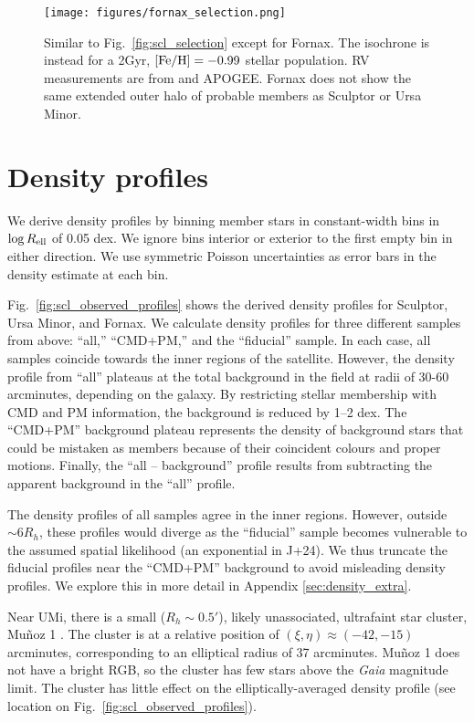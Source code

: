 \begin{figure}
\centering
\texttt{[image: figures/fornax\_selection.png]}
\caption[Fornax sample selection]{Similar to
Fig.~\ref{fig:scl_selection} except for Fornax. The isochrone is instead
for a 2Gyr, \({\rm [Fe/H]}=-0.99\) stellar population. RV measurements
are from \citet{WMO2009} and APOGEE. Fornax does not show the same
extended outer halo of probable members as Sculptor or Ursa
Minor.}\label{fig:fornax_selection}
\end{figure}

\section{Density profiles}\label{sec:data_density_profiles}

We derive density profiles by binning member stars in constant-width
bins in \(\log R_{\rm ell}\) of 0.05 dex. We ignore bins interior or
exterior to the first empty bin in either direction. We use symmetric
Poisson uncertainties as error bars in the density estimate at each bin.

Fig.~\ref{fig:scl_observed_profiles} shows the derived density profiles
for Sculptor, Ursa Minor, and Fornax. We calculate density profiles for
three different samples from above: ``all,'' ``CMD+PM,'' and the
``fiducial'' sample. In each case, all samples coincide towards the
inner regions of the satellite. However, the density profile from
``all'' plateaus at the total background in the field at radii of 30-60
arcminutes, depending on the galaxy. By restricting stellar membership
with CMD and PM information, the background is reduced by 1--2 dex. The
``CMD+PM'' background plateau represents the density of background stars
that could be mistaken as members because of their coincident colours
and proper motions. Finally, the ``all -- background'' profile results
from subtracting the apparent background in the ``all'' profile.

The density profiles of all samples agree in the inner regions. However,
outside \({\sim} 6R_h\), these profiles would diverge as the
``fiducial'' sample becomes vulnerable to the assumed spatial likelihood
(an exponential in J+24). We thus truncate the fiducial profiles near
the ``CMD+PM'' background to avoid misleading density profiles. We
explore this in more detail in Appendix \ref{sec:density_extra}.

Near UMi, there is a small (\(R_h\sim 0.5'\)), likely unassociated,
ultrafaint star cluster, Muñoz 1 \citep{munoz+2012}. The cluster is at a
relative position of \((\xi, \eta) \approx(-42, -15)\) arcminutes,
corresponding to an elliptical radius of 37 arcminutes. Muñoz 1 does not
have a bright RGB, so the cluster has few stars above the \emph{Gaia}
magnitude limit. The cluster has little effect on the
elliptically-averaged density profile (see location on
Fig.~\ref{fig:scl_observed_profiles}).

